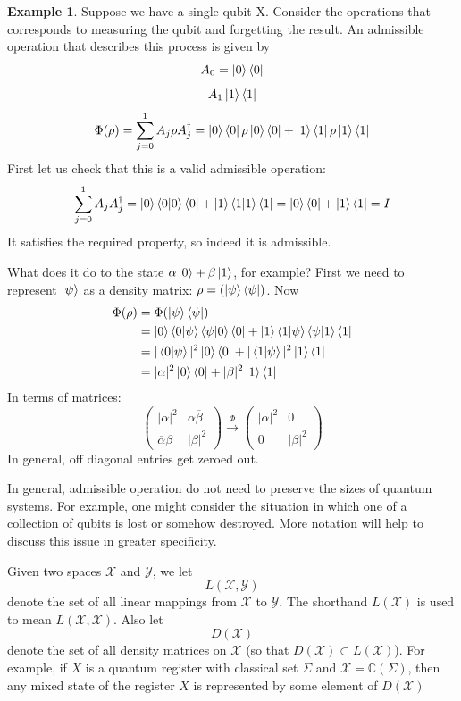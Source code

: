 \documentclass[12pt, oneside]{book}
\theoremstyle{definition}
\theoremstyle{definition}
\newtheorem{example}{Example}[section]
\theoremstyle{remark}
\begin{document}
\begin{example}
    Suppose we have a single qubit X. Consider the operations that corresponds to measuring the qubit and forgetting the result. An admissible operation that describes this process is given by
    \[
    A_0=\ket{0}\bra{0}
    \]
    \[
    A_1\ket{1}\bra{1}
    \]
    \[
    \Phi(\rho)=\sum_{j=0}^1 A_j\rho A_j^{\dagger} =\ket{0}\bra{0}\rho\ket{0}\bra{0} + \ket{1}\bra{1}\rho\ket{1}\bra{1}
    \]
    First let us check that this is a valid admissible operation:
    \[
    \sum_{j=0}^1 A_jA_j^{\dagger} =\ket{0}\braket{0|0}\bra{0} + \ket{1}\braket{1|1}\bra{1} = \ket{0}\bra{0}+\ket{1}\bra{1}=I
    \]
    It satisfies the required property, so indeed it is admissible. 

    What does it do to the state $\alpha\ket{0}+\beta\ket{1}$, for example? First we need to represent $\ket{\psi}$ as a density matrix: $\rho=(\ket{\psi}\bra{\psi})$. Now
    \begin{align*}
    \Phi(\rho) &=\Phi(\ket{\psi}\bra{\psi})\\
    &=\ket{0}\braket{0|\psi}\braket{\psi|0}\bra{0}+\ket{1}\braket{1|\psi}\braket{\psi|1}\bra{1}\\
    &=|\braket{0|\psi}|^2\ket{0}\bra{0}+|\braket{1|\psi}|^2\ket{1}\bra{1}\\
    &=|\alpha|^2\ket{0}\bra{0}+|\beta|^2 \ket{1}\bra{1}
    \end{align*}
    In terms of matrices:
    \[
    \begin{pmatrix} |\alpha|^2 & \alpha\overline{\beta} \\ \overline{\alpha}\beta & |\beta|^2 \end{pmatrix} \xrightarrow{\Phi} \begin{pmatrix} |\alpha|^2 & 0 \\ 0 & |\beta|^2 \end{pmatrix}
    \]
    In general, off diagonal entries get zeroed out.
\end{example}
In general, admissible operation do not need to preserve the sizes of quantum systems. For example, one might consider the situation in which  one of a collection of qubits is lost or somehow destroyed. More notation will help to discuss this issue in greater specificity.

Given two spaces $\mathcal{X}$ and $\mathcal{Y}$, we let
\[
L(\mathcal{X},\mathcal{Y})
\]
denote the set of all linear mappings from $\mathcal{X}$ to $\mathcal{Y}$. The shorthand $L(\mathcal{X})$ is used to mean $L(\mathcal{X},\mathcal{X})$. Also let
\[
D(\mathcal{X})
\]
denote the set of all density matrices on $\mathcal{X}$ (so that $D(\mathcal{X})\subset L(\mathcal{X})$). For example, if $X$ is a quantum register with classical set $\Sigma$ and $\mathcal{X}=\mathbb{C}(\Sigma)$, then any mixed state of the register $X$ is represented by some element of $D(\mathcal{X})$
\end{document}
